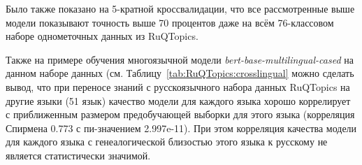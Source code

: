 Было также показано на 5-кратной кроссвалидации, что все рассмотренные выше модели показывают точность выше 70 процентов даже на всём 76-классовом наборе однометочных данных из RuQTopics.

Также на примере обучения многоязычной модели \textit{bert-base-multilingual-cased} на данном наборе данных (см. Таблицу~\ref{tab:RuQTopics:crosslingual} можно сделать вывод, что при переносе знаний с русскоязычного набора данных RuQTopics на другие языки (51 язык) качество модели для каждого языка хорошо коррелирует с приближенным размером предобучающей выборки для этого языка (корреляция Спирмена 0.773 с пи-значением 2.997e-11). При этом корреляция качества модели для каждого языка с генеалогической близостью этого языка к русскому не является статистически значимой.
\begin{table}
\caption{Метрики модели \textit{bert-base-multilingual-cased} на объединенном тестовом наборе данных {MASSIVE} для всех языков. Модель обучалась на версии \textbf{Q} набора данных {RuQTopics}. \textbf{Код} означает код языка(ISO 639-1), \textbf{N} означает число статей в Википедии на этом языке на 11 октября 2018 года, \textbf{Дистанция} означает лингвистическую дистанцию между этим языком и русским, посчитанную в соответствии с работой~\cite{lang_sim}. Усреднено по трем запускам.}
\label{tab:RuQTopics:crosslingual}
\centering
\end{table}
